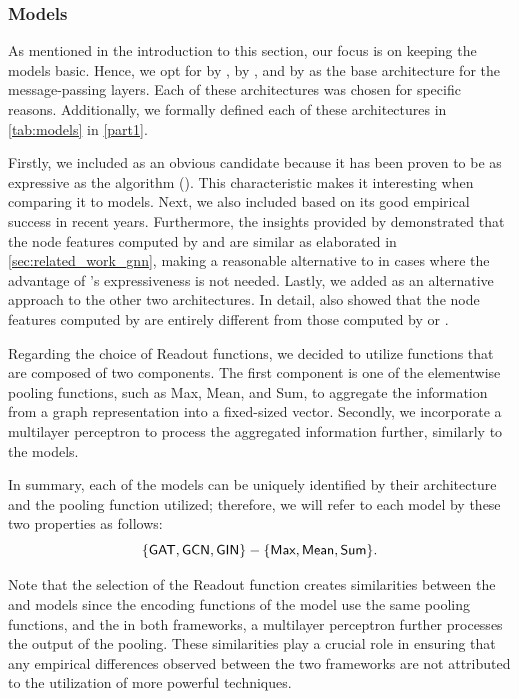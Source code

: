 \subsubsection{\gnn Models}\label{sec:gnn_model_choice}
As mentioned in the introduction to this section, our focus is on keeping the models basic. Hence, we opt for \gin by \cite{Xu2018}, \gcn by \cite{Kip+2017}, and \gat by \cite{Velivckovic2017} as the base architecture for the message-passing layers. Each of these architectures was chosen for specific reasons. Additionally, we formally defined each of these architectures in \cref{tab:models} in \cref{part1}.

Firstly, we included \gin as an obvious candidate because it has been proven to be as expressive as the \wl algorithm (\cite{Xu2018,Morris2018}). This characteristic makes it interesting when comparing it to \wlnn models.
Next, we also included \gcn based on its good empirical success in recent years. Furthermore, the insights provided by \cite{Nikolentzos2023} demonstrated that the node features computed by \gcn and \gin are similar as elaborated in \cref{sec:related_work_gnn}, making \gcn a reasonable alternative to \gin in cases where the advantage of \gin's expressiveness is not needed.
Lastly, we added \gat as an alternative approach to the other two architectures. In detail, \cite{Nikolentzos2023} also showed that the node features computed by \gat are entirely different from those computed by \gin or \gcn.

Regarding the choice of \textsf{Readout} functions, we decided to utilize functions that are composed of two components. The first component is one of the elementwise pooling functions, such as \textsf{Max}, \textsf{Mean}, and \textsf{Sum}, to aggregate the information from a graph representation into a fixed-sized vector. Secondly, we incorporate a multilayer perceptron to process the aggregated information further, similarly to the \wlnn models.

In summary, each of the \gnn models can be uniquely identified by their \gnn architecture and the pooling function utilized; therefore, we will refer to each model by these two properties as follows:
\begin{equation*}
	{\{\gat, \gcn, \gin\}} - \{\textsf{Max}, \textsf{Mean}, \textsf{Sum}\}.
\end{equation*}


Note that the selection of the \textsf{Readout} function creates similarities between the \gnn and \wlnn models since the encoding functions of the \wlnn model use the same pooling functions, and the in both frameworks, a multilayer perceptron further processes the output of the pooling. These similarities play a crucial role in ensuring that any empirical differences observed between the two frameworks are not attributed to the utilization of more powerful techniques.

